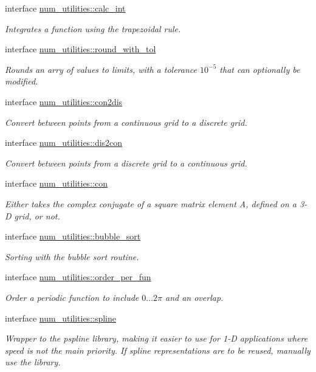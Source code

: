 \begin{DoxyCompactItemize}
interface \hyperlink{interfacenum__utilities_1_1calc__int}{num\+\_\+utilities\+::calc\+\_\+int}
\begin{DoxyCompactList}\small\item\em Integrates a function using the trapezoidal rule. \end{DoxyCompactList}\item 
interface \hyperlink{interfacenum__utilities_1_1round__with__tol}{num\+\_\+utilities\+::round\+\_\+with\+\_\+tol}
\begin{DoxyCompactList}\small\item\em Rounds an arry of values to limits, with a tolerance $10^{-5}$ that can optionally be modified. \end{DoxyCompactList}\item 
interface \hyperlink{interfacenum__utilities_1_1con2dis}{num\+\_\+utilities\+::con2dis}
\begin{DoxyCompactList}\small\item\em Convert between points from a continuous grid to a discrete grid. \end{DoxyCompactList}\item 
interface \hyperlink{interfacenum__utilities_1_1dis2con}{num\+\_\+utilities\+::dis2con}
\begin{DoxyCompactList}\small\item\em Convert between points from a discrete grid to a continuous grid. \end{DoxyCompactList}\item 
interface \hyperlink{interfacenum__utilities_1_1con}{num\+\_\+utilities\+::con}
\begin{DoxyCompactList}\small\item\em Either takes the complex conjugate of a square matrix element A, defined on a 3-\/D grid, or not. \end{DoxyCompactList}\item 
interface \hyperlink{interfacenum__utilities_1_1bubble__sort}{num\+\_\+utilities\+::bubble\+\_\+sort}
\begin{DoxyCompactList}\small\item\em Sorting with the bubble sort routine. \end{DoxyCompactList}\item 
interface \hyperlink{interfacenum__utilities_1_1order__per__fun}{num\+\_\+utilities\+::order\+\_\+per\+\_\+fun}
\begin{DoxyCompactList}\small\item\em Order a periodic function to include $0\ldots 2\pi$ and an overlap. \end{DoxyCompactList}\item 
interface \hyperlink{interfacenum__utilities_1_1spline}{num\+\_\+utilities\+::spline}
\begin{DoxyCompactList}\small\item\em Wrapper to the pspline library, making it easier to use for 1-\/D applications where speed is not the main priority. If spline representations are to be reused, manually use the library. \end{DoxyCompactList}\end{DoxyCompactItemize}
